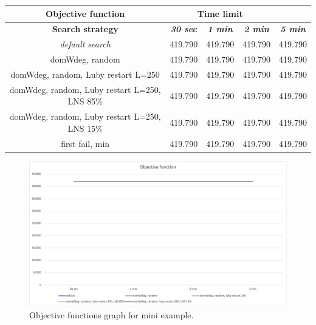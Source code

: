 {
\renewcommand{\arraystretch}{2}
\begin{longtable}[h]{| c | c | c | c | c |}
    \hline
    \textbf{Objective function} & \multicolumn{3}{c}{Time limit} & \\
    \hline
    \textbf{Search strategy} & \textbf{\textit{30 sec}} & \textbf{\textit{1 min}} & \textbf{\textit{2 min}} & \textbf{\textit{5 min}} \\
    \hline
    \endhead
    \textit{default search}                       & 419.790 & 419.790 & 419.790 & 419.790 \\
    \hline
    domWdeg, random                               & 419.790 & 419.790 & 419.790 & 419.790 \\
    \hline
    domWdeg, random, Luby restart L=250           & 419.790 & 419.790 & 419.790 & 419.790 \\
    \hline
    domWdeg, random, Luby restart L=250, LNS 85\% & 419.790 & 419.790 & 419.790 & 419.790 \\
    \hline
    domWdeg, random, Luby restart L=250, LNS 15\% & 419.790 & 419.790 & 419.790 & 419.790 \\
    \hline
    first fail, min                               & 419.790 & 419.790 & 419.790 & 419.790 \\
    \hline
\end{longtable}
}

\begin{figure}[H]
    \centering
    \includegraphics[width=1.0\columnwidth]{../graphs/mini-example-objf.png}
    \caption{Objective functions graph for mini example.}
\end{figure}

